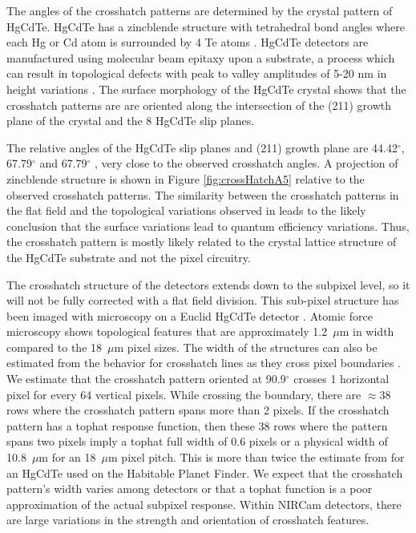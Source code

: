 \documentclass[]{aastex62}
\newcommand{\degree}{^\circ}
\begin{document}
The angles of the crosshatch patterns are determined by the crystal pattern of HgCdTe.
HgCdTe has a zincblende structure with tetrahedral bond angles where each Hg or Cd atom is surrounded by 4 Te atoms \citep{gemain2012mercVacanciesHgCdTe}.
HgCdTe detectors are manufactured using molecular beam epitaxy upon a substrate, a process which can result in topological defects with peak to valley amplitudes of 5-20 nm in height variations \citep{chang2008surfaceMorphologyHgCdTe}.
The surface morphology of the HgCdTe crystal shows that the crosshatch patterns are are oriented along the intersection of the (211) growth plane of the crystal and the 8 HgCdTe slip planes.

The relative angles of the HgCdTe slip planes and (211) growth plane are 44.42$\degree$, 67.79$\degree$ and 67.79$\degree$ \citep{chang2008surfaceMorphologyHgCdTe}, very close to the observed crosshatch angles.
A projection of zincblende structure is shown in Figure \ref{fig:crossHatchA5} relative to the observed crosshatch patterns.
The similarity between the crosshatch patterns in the flat field and the topological variations observed in \citet{chang2008surfaceMorphologyHgCdTe} leads to the likely conclusion that the surface variations lead to quantum efficiency variations.
Thus, the crosshatch pattern is mostly likely related to the crystal lattice structure of the HgCdTe substrate and not the pixel circuitry.

The crosshatch structure of the detectors extends down to the subpixel level, so it will not be fully corrected with a flat field division.
This sub-pixel structure has been imaged with microscopy on a Euclid HgCdTe detector \citep{shapiro2018crosshatch}.
Atomic force microscopy shows topological features that are approximately 1.2~$\mu$m in width \citep{chang2008surfaceMorphologyHgCdTe} compared to the 18~$\mu$m pixel sizes.
The width of the structures can also be estimated from the behavior for crosshatch lines as they cross pixel boundaries \citep{ninan2019crosshatchHPF}.
We estimate that the crosshatch pattern oriented at 90.9$\degree$ crosses 1 horizontal pixel for every 64 vertical pixels.
While crossing the boundary, there are $\approx 38$ rows where the crosshatch pattern spans more than 2 pixels.
If the crosshatch pattern has a tophat response function, then these 38 rows where the pattern spans two pixels imply a tophat full width of 0.6 pixels or a physical width of 10.8~$\mu$m for an 18~$\mu$m pixel pitch.
This is more than twice the estimate from \citet{ninan2019crosshatchHPF} for an HgCdTe used on the Habitable Planet Finder.
We expect that the crosshatch pattern's width varies among detectors or that a tophat function is a poor approximation of the actual subpixel response.
Within NIRCam detectors, there are large variations in the strength and orientation of crosshatch features.
\end{document}

